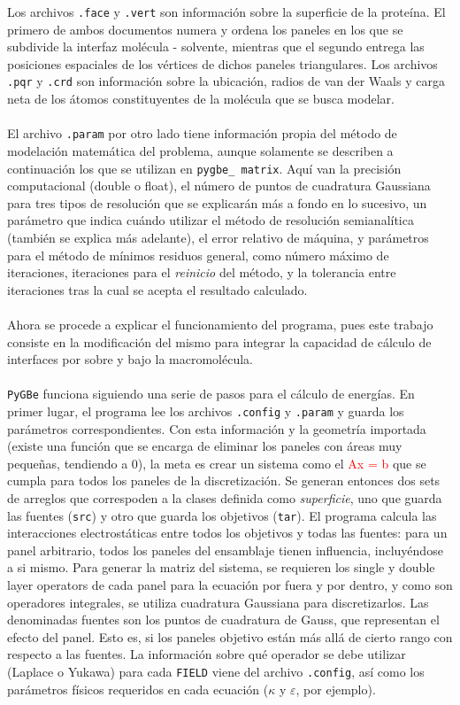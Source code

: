 \documentclass[12pt, notitlepage]{article}
\numberwithin{equation}{section}
\begin{document}
Los archivos \texttt{.face} y \texttt{.vert} son información sobre la superficie de la proteína. El primero de ambos documentos numera y ordena los paneles en los que se subdivide la interfaz molécula - solvente, mientras que el segundo entrega las posiciones espaciales de los vértices de dichos paneles triangulares. Los archivos \texttt{.pqr} y \texttt{.crd} son información sobre la ubicación, radios de van der Waals y carga neta de los átomos constituyentes de la molécula que se busca modelar.\\\\
El archivo \texttt{.param} por otro lado tiene información propia del método de modelación matemática del problema, aunque solamente se describen a continuación los que se utilizan en \texttt{pygbe\_ matrix}. Aquí van la precisión computacional (double o float), el número de puntos de cuadratura Gaussiana para tres tipos de resolución que se explicarán más a fondo en lo sucesivo, un parámetro que indica cuándo utilizar el método de resolución semianalítica (también se explica más adelante), el error relativo de máquina, y parámetros para el método de mínimos residuos general, como número máximo de iteraciones, iteraciones para el \textit{reinicio} del método, y la tolerancia entre iteraciones tras la cual se acepta el resultado calculado.\\\\
Ahora se procede a explicar el funcionamiento del programa, pues este trabajo consiste en la modificación del mismo para integrar la capacidad de cálculo de interfaces por sobre y bajo la macromolécula.\\\\
\texttt{PyGBe} funciona siguiendo una serie de pasos para el cálculo de energías. En primer lugar, el programa lee los archivos \texttt{.config} y \texttt{.param} y guarda los parámetros correspondientes. Con esta información y la geometría importada (existe una función que se encarga de eliminar los paneles con áreas muy pequeñas, tendiendo a 0), la meta es crear un sistema como el \textcolor{red}{Ax = b} que se cumpla para todos los paneles de la discretización. Se generan entonces dos sets de arreglos que correspoden a la clases definida como \textit{superficie}, uno que guarda las fuentes (\texttt{src}) y otro que guarda los objetivos (\texttt{tar}). El programa calcula las interacciones electrostáticas entre todos los objetivos y todas las fuentes: para un panel arbitrario, todos los paneles del ensamblaje tienen influencia, incluyéndose a si mismo. Para generar la matriz del sistema, se requieren los single y double layer operators de cada panel para la ecuación por fuera y por dentro, y como son operadores integrales, se utiliza cuadratura Gaussiana para discretizarlos. Las denominadas fuentes son los puntos de cuadratura de Gauss, que representan el efecto del panel. Esto es, si los paneles objetivo están más allá de cierto rango con respecto a las fuentes. La información sobre qué operador se debe utilizar (Laplace o Yukawa) para cada \texttt{FIELD} viene del archivo \texttt{.config}, así como los parámetros físicos requeridos en cada ecuación ($\kappa$ y $\varepsilon$, por ejemplo).\\\\
\end{document}
